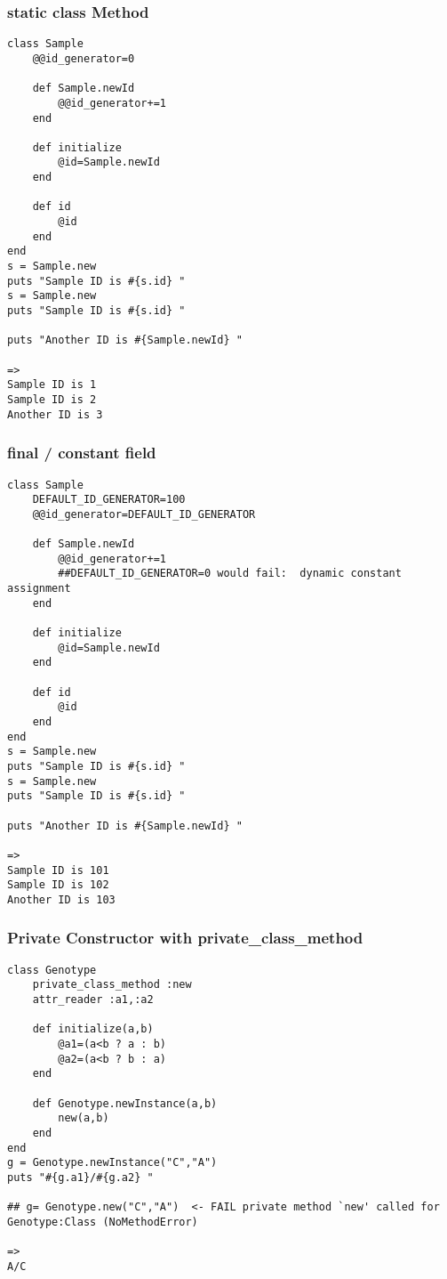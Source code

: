 \documentclass{article}
\begin{document}
\subsubsection{static class Method}
\begin{lstlisting}
class Sample
	@@id_generator=0
	
	def Sample.newId
		@@id_generator+=1
	end
	
	def initialize
		@id=Sample.newId
	end
	
	def id
		@id
	end
end
s = Sample.new
puts "Sample ID is #{s.id} "
s = Sample.new
puts "Sample ID is #{s.id} "

puts "Another ID is #{Sample.newId} "

=>
Sample ID is 1 
Sample ID is 2 
Another ID is 3 
\end{lstlisting}

\subsubsection{final / constant field}
\begin{lstlisting}
class Sample
	DEFAULT_ID_GENERATOR=100
	@@id_generator=DEFAULT_ID_GENERATOR
	
	def Sample.newId
		@@id_generator+=1
		##DEFAULT_ID_GENERATOR=0 would fail:  dynamic constant assignment
	end
	
	def initialize
		@id=Sample.newId
	end
	
	def id
		@id
	end
end
s = Sample.new
puts "Sample ID is #{s.id} "
s = Sample.new
puts "Sample ID is #{s.id} "

puts "Another ID is #{Sample.newId} "

=>
Sample ID is 101 
Sample ID is 102 
Another ID is 103 
\end{lstlisting}

\subsubsection{Private Constructor with private\_class\_method}
\begin{lstlisting}
class Genotype
	private_class_method :new
	attr_reader :a1,:a2
	
	def initialize(a,b)
		@a1=(a<b ? a : b)
		@a2=(a<b ? b : a)
	end
	
	def Genotype.newInstance(a,b)
		new(a,b)
	end
end
g = Genotype.newInstance("C","A")
puts "#{g.a1}/#{g.a2} "

## g= Genotype.new("C","A")  <- FAIL private method `new' called for Genotype:Class (NoMethodError)

=>
A/C
\end{lstlisting}
\end{document}
